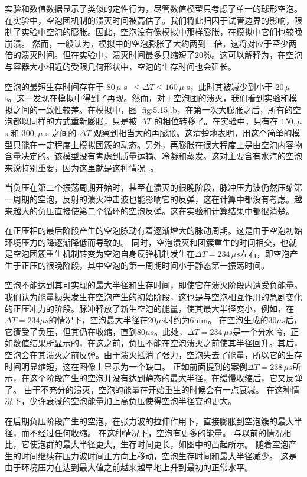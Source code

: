 实验和数值数据显示了类似的定性行为，尽管数值模型只考虑了单一的球形空泡。在实验中，空泡团机制的溃灭时间被高估了。我们将此归因于试管边界的影响，限制了实验中空泡的膨胀。因此，空泡没有像模拟中那样膨胀，在模拟中它们也较晚崩溃。
然而，一般认为，模拟中的空泡膨胀了大约两到三倍，这将对应于至少两倍的溃灭时间。但在实验中，溃灭时间最多只缩短了20％。这可以解释为，在空泡与容器大小相近的受限几何形状中，空泡的生存时间也会延长\cite{quinto-su_cavitation_2009}。

空泡的最短生存时间存在于 $80\,\mu$ s $\,\le Δ T\le 160\,\mu$
s，此时其被减少到小于 $20\,\mu$
s。这一发现在模拟中得到了再现。然而，对于空泡团的溃灭，我们看到实验和模拟之间的一致性较差。在模拟中，图
\ref{fig:5.15}.b，在第一次大膨胀之后，所有的空泡都以同样的方式重新膨胀，只是被
$\Delta T$ 的相位转移了。在实验中，只有在 $150,\mu$ s 和 $300,\mu$
s 之间的 $\Delta T$
观察到相当大的再膨胀。这清楚地表明，用这个简单的模型只能在一定程度上模拟团簇的动态。另外，再膨胀在很大程度上是由空泡内容物含量决定的。该模型没有考虑到质量运输、冷凝和蒸发。这对主要含有水汽的空泡来说特别重要，因为这里就是这种情况
\cite{akhatov_collapse_2001}.。

当负压在第二个振荡周期开始时，甚至在溃灭的很晚阶段，脉冲压力波仍然压缩第一周期的空泡，反射的溃灭冲击波也能影响它的反弹，这在计算中都没有考虑。越来越大的负压直接使第二个循环的空泡反弹。这在实验和计算结果中都很清楚。

在正压相的最后阶段产生的空泡脉动有着逐渐增大的脉动周期。这是由于空泡初始环境压力的降逐渐降低而导致的。
同时，空泡溃灭和团簇重生的时间相交，也就是空泡团簇重生机制转变为空泡自身反弹机制发生在$\Delta T=234\,\mu s$左右，即空泡产生于正压的很晚阶段，其中空泡的第一周期时间小于静态第一振荡时间。

空泡不能达到其可实现的最大半径和生存时间，即使它在溃灭阶段内遭受负能量。
我们认为能量损失发生在空泡产生的初始阶段，这也是与空泡相互作用的急剧变化的正压冲力的阶段。脉冲释放了新生空泡的能量，使其最大半径变小，例如，在$\Delta T=234\mu s$的情况下，空泡最大半径在$20\mu s$时约为6mm。
在空泡生成的$30\mu s$后，它遭受了负压，但其仍在收缩，直到$80\mu s$。此处，$\Delta T=234\,\mu s$是一个分水岭，正如数值结果所显示的，在这之前，负压不能在空泡溃灭之前使其半径回升。其后，空泡会在其溃灭之前反弹。由于溃灭抵消了张力，空泡失去了能量，所以它的生存时间明显缩短，这在图像上显示为一个缺口。
正如前面提到的案例$\Delta T=238\,\mu s$所示，在这个阶段产生的空泡并没有达到静态的最大半径，在缓慢收缩后，它又反弹了。
由于不充分的溃灭，空泡的能量在开始重生的时候会有一点衰减。
在这种情况下，少许衰减的空泡能量加上高负压使得空泡半径变的更大。

在后期负压阶段产生的空泡，在张力波的拉伸作用下，直接膨胀到空泡簇的最大半径，而不经过任何收缩。
在这种情况下，空泡有更多的能量。
与以前的情况相比，它使泡群的最大半径更大，生存时间更长，如图中的凸起所示。
随着空泡产生的时间继续在压力波时间正方向上移动，空泡生存时间和最大半径减少。
这是由于环境压力在达到最大值之前越来越早地上升到最初的正常水平。

